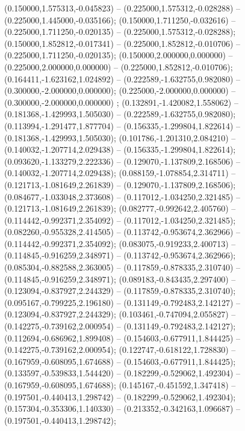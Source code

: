  (0.150000,1.575313,-0.045823) -- (0.225000,1.575312,-0.028288) -- (0.225000,1.445000,-0.035166);
 (0.150000,1.711250,-0.032616) -- (0.225000,1.711250,-0.020135) -- (0.225000,1.575312,-0.028288);
 (0.150000,1.852812,-0.017341) -- (0.225000,1.852812,-0.010706) -- (0.225000,1.711250,-0.020135);
 (0.150000,2.000000,0.000000) -- (0.225000,2.000000,0.000000) -- (0.225000,1.852812,-0.010706);
 (0.164411,-1.623162,1.024892) -- (0.222589,-1.632755,0.982080) -- (0.300000,-2.000000,0.000000);
 (0.225000,-2.000000,0.000000) -- (0.300000,-2.000000,0.000000) ;
 (0.132891,-1.420082,1.558062) -- (0.181368,-1.429993,1.505030) -- (0.222589,-1.632755,0.982080);
 (0.113994,-1.291477,1.877704) -- (0.156335,-1.299804,1.822614) -- (0.181368,-1.429993,1.505030);
 (0.101786,-1.201310,2.084210) -- (0.140032,-1.207714,2.029438) -- (0.156335,-1.299804,1.822614);
 (0.093620,-1.133279,2.222336) -- (0.129070,-1.137809,2.168506) -- (0.140032,-1.207714,2.029438);
 (0.088159,-1.078854,2.314711) -- (0.121713,-1.081649,2.261839) -- (0.129070,-1.137809,2.168506);
 (0.084677,-1.033048,2.373608) -- (0.117012,-1.034250,2.321485) -- (0.121713,-1.081649,2.261839);
 (0.082777,-0.992642,2.405760) -- (0.114442,-0.992371,2.354092) -- (0.117012,-1.034250,2.321485);
 (0.082260,-0.955328,2.414505) -- (0.113742,-0.953674,2.362966) -- (0.114442,-0.992371,2.354092);
 (0.083075,-0.919233,2.400713) -- (0.114845,-0.916259,2.348971) -- (0.113742,-0.953674,2.362966);
 (0.085304,-0.882588,2.363005) -- (0.117859,-0.878335,2.310740) -- (0.114845,-0.916259,2.348971);
 (0.089183,-0.843435,2.297400) -- (0.123094,-0.837927,2.244329) -- (0.117859,-0.878335,2.310740);
 (0.095167,-0.799225,2.196180) -- (0.131149,-0.792483,2.142127) -- (0.123094,-0.837927,2.244329);
 (0.103461,-0.747094,2.055827) -- (0.142275,-0.739162,2.000954) -- (0.131149,-0.792483,2.142127);
 (0.112694,-0.686962,1.899408) -- (0.154603,-0.677911,1.844425) -- (0.142275,-0.739162,2.000954);
 (0.122747,-0.618122,1.728830) -- (0.167959,-0.608095,1.674688) -- (0.154603,-0.677911,1.844425);
 (0.133597,-0.539833,1.544420) -- (0.182299,-0.529062,1.492304) -- (0.167959,-0.608095,1.674688);
 (0.145167,-0.451592,1.347418) -- (0.197501,-0.440413,1.298742) -- (0.182299,-0.529062,1.492304);
 (0.157304,-0.353306,1.140330) -- (0.213352,-0.342163,1.096687) -- (0.197501,-0.440413,1.298742);
